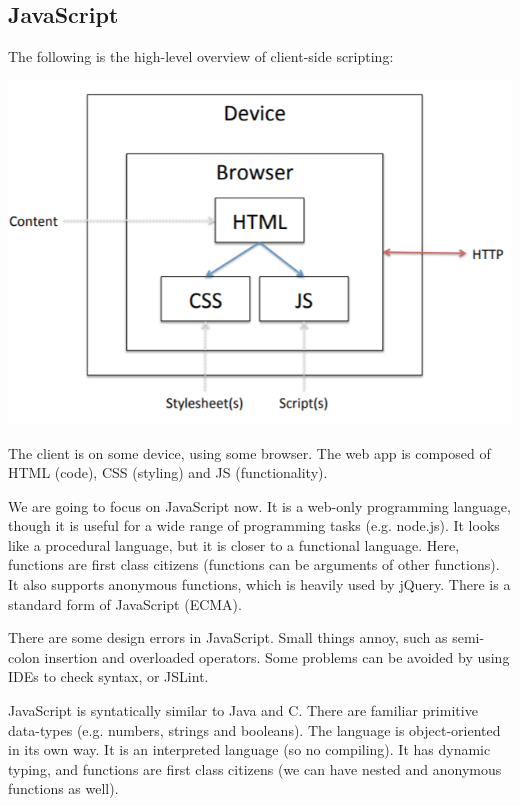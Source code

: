 \documentclass[a4paper, openany]{memoir}
\begin{document}
\subsection{JavaScript}
The following is the high-level overview of client-side scripting:
\begin{center}
    \includegraphics[scale=0.7]{src/L13I1.PNG}
\end{center}
The client is on some device, using some browser. The web app is composed of HTML (code), CSS (styling) and JS (functionality). 

We are going to focus on JavaScript now. It is a web-only programming language, though it is useful for a wide range of programming tasks (e.g. node.js). It looks like a procedural language, but it is closer to a functional language. Here, functions are first class citizens (functions can be arguments of other functions). It also supports anonymous functions, which is heavily used by jQuery. There is a standard form of JavaScript (ECMA).

There are some design errors in JavaScript. Small things annoy, such as semi-colon insertion and overloaded operators. Some problems can be avoided by using IDEs to check syntax, or JSLint.

JavaScript is syntatically similar to Java and C. There are familiar primitive data-types (e.g. numbers, strings and booleans). The language is object-oriented in its own way. It is an interpreted language (so no compiling). It has dynamic typing, and functions are first class citizens (we can have nested and anonymous functions as well).
\end{document}

